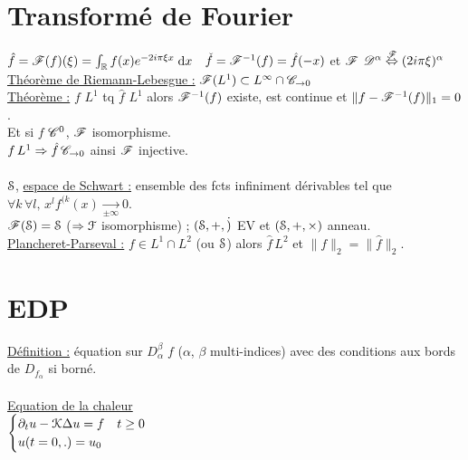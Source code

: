 \documentclass[12 pt]{book}
\begin{document}
\section*{Transformé de Fourier}
$\hat{f}=\mathscr{F}(f)(\xi) = \int_{\mathbb{R}} f(x) e^{-2i\pi \xi x} \; \text{d}x$ \ $\check{f}=\mathscr{F}^{-1}(f) = \hat{f}(-x)$ et $\mathscr{F}$ \quad $\mathscr{D}^\alpha \overset{\mathscr{F}}{\Leftrightarrow} (2i\pi\xi)^\alpha$\\
\underline{Théorème de Riemann-Lebesgue :} $\mathscr{F}(L^1) \subset L^\infty \cap \mathscr{C}_{\to 0}$\\
\underline{Théorème :} $f$ $L^1$ tq $\hat{f}$ $L^1$ alors $\mathscr{F}^{-1}(f)$ existe, est continue et $\| f - \mathscr{F}^{-1}(f)\|_1 = 0$.\\ Et si $f$ $\mathscr{C}^0$, $\mathscr{F}$ isomorphisme.\\
$f \, L^1 \Rightarrow \hat{f} \, \mathscr{C}_{\rightarrow 0}$ ainsi $\mathscr{F}$ injective.\\
\\
$\mathcal{S}$, \underline{espace de Schwart :} ensemble des fcts infiniment dérivables tel que $\forall k\,\forall l,\, x^l f^{(k}(x) \underset{\pm\infty}{\longrightarrow} 0$.\\
$\mathscr{F}(\mathcal{S})=\mathcal{S}$ ($\Rightarrow \mathcal{F}$ isomorphisme) ; $(\mathcal{S}, +, \dot)$ EV et $(\mathcal{S},+,\times)$ anneau.\\
\underline{Plancheret-Parseval :} $f\in L^1\cap L^2$ (ou $\mathcal{S}$) alors $\hat{f}\, L^2$ et $\|f\|_2 = \|\hat{f}\|_2$.\\

\section*{EDP}

\underline{Définition :} équation sur $D_\alpha^\beta\;f$ ($\alpha$, $\beta$ multi-indices) avec des conditions aux bords de $D_{f_\alpha}$ si borné.\\
\text{ }\\
\underline{Equation de la chaleur}\\
$
\begin{cases}
\partial_t u - \mathcal{K} \Delta u = f \quad t\geq 0\\
u(t=0, .) = u_0
\end{cases}
$
\end{document}
